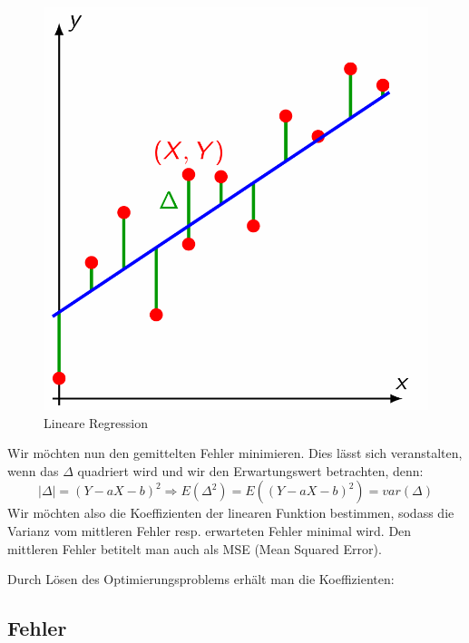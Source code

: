 \documentclass[../Main.tex]{subfiles}
\begin{document}
\begin{figure}[H]
    \centering
    \includegraphics[width=0.5\linewidth]{Images/lineare-regression.png}
    \caption{Lineare Regression}
\end{figure}

Wir möchten nun den gemittelten Fehler minimieren. Dies lässt sich veranstalten,
wenn das \(\Delta\) quadriert wird und wir den Erwartungswert betrachten, denn:
\begin{equation}
    |\Delta| = (Y-aX-b)^2 \Rightarrow E(\Delta^2) = E((Y-aX-b)^2) = var(\Delta)
\end{equation}
Wir möchten also die Koeffizienten der linearen Funktion bestimmen, sodass
die Varianz vom mittleren Fehler resp. erwarteten Fehler minimal wird. Den 
mittleren Fehler betitelt man auch als MSE (Mean Squared Error).

Durch Lösen des Optimierungsproblems erhält man die Koeffizienten:

\subsection{Fehler}
\end{document}
